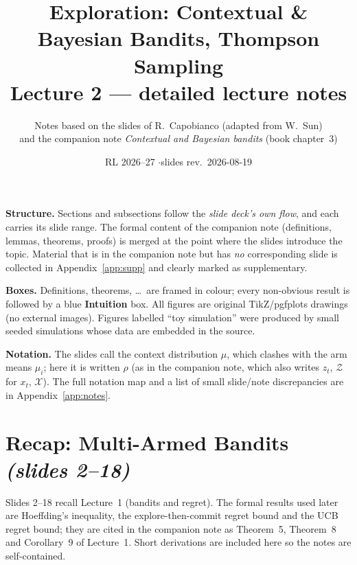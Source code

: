 \documentclass[11pt,a4paper]{article}
\title{\textbf{Exploration: Contextual \& Bayesian Bandits, Thompson Sampling}\\[3pt]
\large Lecture 2 --- detailed lecture notes}
\author{Notes based on the slides of R.\ Capobianco (adapted from W.\ Sun) \\
and the companion note \emph{Contextual and Bayesian bandits} (book chapter~3)}
\date{RL 2026--27 \quad$\cdot$\quad slides rev.\ 2026-08-19}
\newcommand{\calX}{\mathcal{X}}
\newcommand{\slides}[1]{\emph{(slides #1)}}
\theoremstyle{plain}
\theoremstyle{definition}
\theoremstyle{remark}
\begin{document}
\maketitle
\tableofcontents

\bigskip
\begin{tcolorbox}[enhanced,colback=white,colframe=black!40,boxrule=0.5pt,arc=2pt,title={\small How to read these notes},fonttitle=\bfseries]
\small
\textbf{Structure.} Sections and subsections follow the \emph{slide deck's own flow}, and each carries its
slide range. The formal content of the companion note (definitions, lemmas, theorems, proofs) is merged at
the point where the slides introduce the topic. Material that is in the companion note but has \emph{no}
corresponding slide is collected in Appendix~\ref{app:supp} and clearly marked as supplementary.

\textbf{Boxes.} Definitions, theorems, \dots\ are framed in colour; every non-obvious result is followed by a
blue \textbf{Intuition} box. All figures are original TikZ/pgfplots drawings (no external images). Figures
labelled ``toy simulation'' were produced by small seeded simulations whose data are embedded in the source.

\textbf{Notation.} The slides call the context distribution $\mu$, which clashes with the arm means $\mu_i$;
here it is written $\rho$ (as in the companion note, which also writes $z_t$, $\mathcal Z$ for $x_t$, $\calX$).
The full notation map and a list of small slide/note discrepancies are in Appendix~\ref{app:notes}.
\end{tcolorbox}
\newcommand{\civ}[4]{%
  \draw[thick] (#1,{#2-#4}) -- (#1,{#2+#4});
  \fill (#1,{#2-#4}) circle (1.8pt); \fill (#1,{#2+#4}) circle (1.8pt); \fill (#1,#2) circle (1.8pt);
  \fill[green!50!black] (#1,#3) circle (2.4pt);}

\section{Recap: Multi-Armed Bandits \slides{2--18}}

Slides 2--18 recall Lecture~1 (bandits and regret). The formal results used later are
Hoeffding's inequality, the explore-then-commit regret bound and the UCB regret bound; they are cited in the
companion note as Theorem~5, Theorem~8 and Corollary~9 of Lecture~1. Short derivations are included here so the
notes are self-contained.
\end{document}
